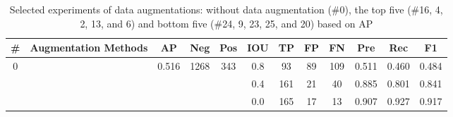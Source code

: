 \documentclass[authoryear,preprint,review,12pt]{elsarticle}
\begin{document}
\begin{table}
\scriptsize
\caption{Selected experiments of data augmentations: without data augmentation (\#0), the top five (\#16, 4, 2, 13, and 6) and bottom five (\#24, 9, 23, 25, and 20) based on AP}
\label{table_acc_imgaug}
\begin{tabular}{c >{\centering\arraybackslash}m{2.2cm} c c  c ccc c c c c}
\toprule
\textbf{\#}&\textbf{Augmentation Methods}&\textbf{AP}&\textbf{Neg}&\textbf{Pos}&\textbf{IOU}&\textbf{TP}&\textbf{FP}&\textbf{FN}&\textbf{Pre}&\textbf{Rec}&\textbf{F1} \\
\midrule 

\multirow{3}{*}{0} &  \multirow{3}{*}{} & \multirow{3}{*}{0.516} & \multirow{3}{*}{1268} & \multirow{3}{*}{343} &0.8 & 93	&89	&109&	0.511 &	0.460& 	0.484  \\ [-1ex]
 &  & &  &   & 0.4 & 161&	21	&40	&0.885 &	0.801 &	0.841  \\[-1ex]
 &  & &  &   & 0.0 & 165&	17	&13&	0.907 	&0.927 	&0.917  \\[-1ex]

\hline 
\hline


\end{tabular}
\end{table}
\end{document}
